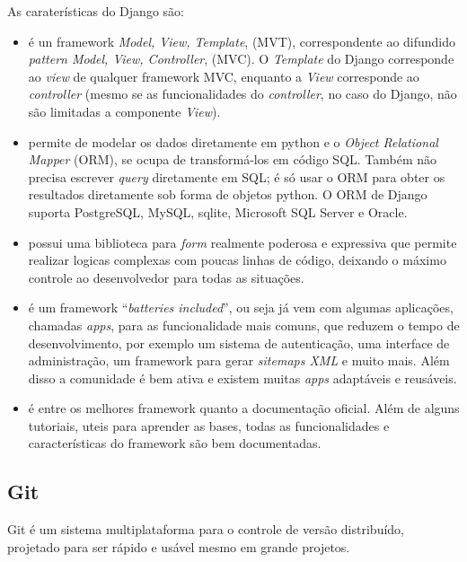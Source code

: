 As caraterísticas do Django são:
\begin{itemize}
\item é un framework \emph{Model, View, Template}, (MVT),
  correspondente ao difundido \emph{pattern Model, View, Controller},
  (MVC). O \emph{Template} do Django corresponde ao \emph{view} de
  qualquer framework MVC, enquanto a \emph{View} corresponde ao
  \emph{controller} (mesmo se as funcionalidades do \emph{controller},
  no caso do Django, não são limitadas a componente \emph{View}).
\item permite de modelar os dados diretamente em python e o
  \emph{Object Relational Mapper} (ORM), se ocupa de transformá-los em
  código SQL. Também não precisa escrever \emph{query} diretamente em
  SQL; é só usar o ORM para obter os resultados diretamente sob forma
  de objetos python. O ORM de Django suporta PostgreSQL, MySQL, sqlite,
  Microsoft SQL Server e Oracle.
\item possui uma biblioteca para \emph{form} realmente poderosa e
  expressiva que permite realizar logicas complexas com poucas linhas
  de código, deixando o máximo controle ao desenvolvedor para todas as
  situações. 
\item é um framework ``\emph{batteries included}'', ou seja já vem com
  algumas aplicações, chamadas \emph{apps}, para as funcionalidade
  mais comuns, que reduzem o tempo de desenvolvimento, por exemplo um
  sistema de autenticação, uma interface de administração, um
  framework para gerar \emph{sitemaps XML} e muito mais. Além disso a
  comunidade é bem ativa e existem muitas \emph{apps} adaptáveis e
  reusáveis. 
\item é entre os melhores framework quanto a documentação
  oficial. Além de alguns tutoriais, uteis para aprender as bases,
  todas as funcionalidades e características do framework são
  bem documentadas.
\end{itemize}


\subsection{Git}\label{sec:GIT}
Git é um sistema multiplataforma para o controle de versão
distribuído, projetado para ser rápido e usável mesmo em grande
projetos. 

